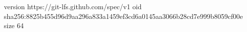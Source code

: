 version https://git-lfs.github.com/spec/v1
oid sha256:8825b455d96d9aa296a833a1459ef3cd6a0145aa3066b28cd7e999b8059cf00e
size 64
